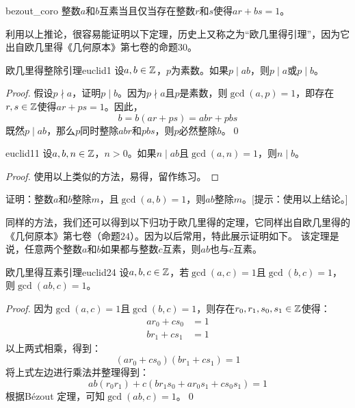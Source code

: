 \begin{corollary}{}{bezout_coro}
整数$a$和$b$互素当且仅当存在整数$r$和$s$使得$ar + bs = 1$。
\end{corollary}

利用以上推论，很容易能证明以下定理，历史上又称之为“欧几里得引理”，因为它出自欧几里得《几何原本》第七卷的命题$30$。
\begin{theorem}{欧几里得整除引理}{euclid1}
	设$a, b \in {\mathbb Z}$，$p$为素数。如果$p \mid ab$，则$p \mid a$或$p \mid b$。
\end{theorem}
\begin{proof}
假设$p \nmid a$，证明$p \mid b$。因为$p \nmid a$且$p$是素数，则$\gcd(a, p)= 1$，即存在$r,s \in {\mathbb Z}$使得$ar + ps = 1$。因此，
$$b = b(ar + ps) = abr + pbs$$
既然$p \mid ab$，那么$p$同时整除$abr$和$pbs$，则$p$必然整除$b$。\qed
\end{proof}

\begin{corollary}{}{euclid11}
	设$a, b , n\in {\mathbb Z}$，$n>0$。如果$n \mid ab$且$\gcd(a, n)=1$，则$n \mid b$。
\end{corollary}
\begin{proof}
使用以上类似的方法，易得，留作练习。
\end{proof}

\begin{thinking}
	证明：整数$a$和$b$整除$m$，且$\gcd(a,b)=1$，则$ab$整除$m$。[提示：使用以上结论。]
\end{thinking}

同样的方法，我们还可以得到以下归功于欧几里得的定理，它同样出自欧几里得的《几何原本》第七卷（命题$24$）。因为以后常用，特此展示证明如下。
该定理是说，任意两个整数$a$和$b$如果都与整数$c$互素，则$ab$也与$c$互素。
\begin{theorem}{欧几里得互素引理}{euclid24}
设$a, b, c\in {\mathbb Z}$，若$\gcd(a,c) = 1$且$\gcd(b, c)=1$，则$\gcd(ab, c) =1$。
\end{theorem}
\begin{proof}
因为$\gcd(a,c) = 1$且$\gcd(b, c)=1$，则存在$r_0, r_1, s_0, s_1 \in {\mathbb Z}$使得：
\begin{align*}
a r_0 + c s_0 &= 1 \\
b r_1 + c s_1 &= 1
\end{align*}
以上两式相乘，得到：
\[(a r_0 + c s_0) (b r_1 + c s_1) = 1\]
将上式左边进行乘法并整理得到：
\[ab(r_0r_1) + c(b r_1 s_0 + a r_0 s_1 + c s_0 s_1) = 1\]
根据B\'{e}zout 定理，可知$\gcd(ab, c)=1$。\qed
\end{proof}

